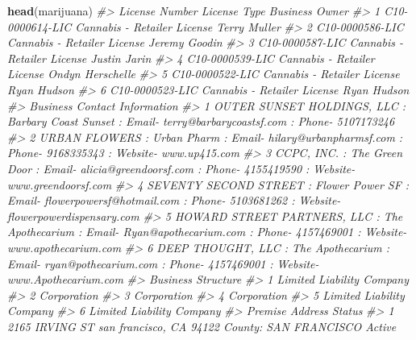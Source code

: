 \documentclass[
  12pt,
]{book}
\newenvironment{Shaded}{\begin{snugshade}}{\end{snugshade}}
\newcommand{\CommentTok}[1]{\textcolor[rgb]{0.37,0.37,0.37}{\textit{#1}}}
\newcommand{\KeywordTok}[1]{\textcolor[rgb]{0.27,0.27,0.27}{\textbf{#1}}}
\newcommand{\NormalTok}[1]{#1}
\begin{document}
\begin{Shaded}
\begin{Highlighting}[]
\KeywordTok{head}\NormalTok{(marijuana)}
\CommentTok{\#\textgreater{}    License Number                License Type   Business Owner}
\CommentTok{\#\textgreater{} 1 C10{-}0000614{-}LIC Cannabis {-} Retailer License     Terry Muller}
\CommentTok{\#\textgreater{} 2 C10{-}0000586{-}LIC Cannabis {-} Retailer License    Jeremy Goodin}
\CommentTok{\#\textgreater{} 3 C10{-}0000587{-}LIC Cannabis {-} Retailer License     Justin Jarin}
\CommentTok{\#\textgreater{} 4 C10{-}0000539{-}LIC Cannabis {-} Retailer License Ondyn Herschelle}
\CommentTok{\#\textgreater{} 5 C10{-}0000522{-}LIC Cannabis {-} Retailer License      Ryan Hudson}
\CommentTok{\#\textgreater{} 6 C10{-}0000523{-}LIC Cannabis {-} Retailer License      Ryan Hudson}
\CommentTok{\#\textgreater{}                                                                                                           Business Contact Information}
\CommentTok{\#\textgreater{} 1                             OUTER SUNSET HOLDINGS, LLC  : Barbary Coast Sunset : Email{-} terry@barbarycoastsf.com : Phone{-} 5107173246}
\CommentTok{\#\textgreater{} 2                           URBAN FLOWERS  : Urban Pharm : Email{-} hilary@urbanpharmsf.com : Phone{-} 9168335343 : Website{-} www.up415.com}
\CommentTok{\#\textgreater{} 3                      CCPC, INC.  : The Green Door : Email{-} alicia@greendoorsf.com : Phone{-} 4155419590 : Website{-} www.greendoorsf.com}
\CommentTok{\#\textgreater{} 4 SEVENTY SECOND STREET  : Flower Power SF : Email{-} flowerpowersf@hotmail.com : Phone{-} 5103681262 : Website{-} flowerpowerdispensary.com}
\CommentTok{\#\textgreater{} 5   HOWARD STREET PARTNERS, LLC  : The Apothecarium : Email{-} Ryan@apothecarium.com : Phone{-} 4157469001 : Website{-} www.apothecarium.com}
\CommentTok{\#\textgreater{} 6              DEEP THOUGHT, LLC  : The Apothecarium : Email{-} ryan@pothecarium.com : Phone{-} 4157469001 : Website{-} www.Apothecarium.com}
\CommentTok{\#\textgreater{}          Business Structure}
\CommentTok{\#\textgreater{} 1 Limited Liability Company}
\CommentTok{\#\textgreater{} 2               Corporation}
\CommentTok{\#\textgreater{} 3               Corporation}
\CommentTok{\#\textgreater{} 4               Corporation}
\CommentTok{\#\textgreater{} 5 Limited Liability Company}
\CommentTok{\#\textgreater{} 6 Limited Liability Company}
\CommentTok{\#\textgreater{}                                                 Premise Address Status}
\CommentTok{\#\textgreater{} 1  2165 IRVING ST san francisco, CA 94122 County: SAN FRANCISCO Active}

\end{Highlighting}
\end{Shaded}
\end{document}
